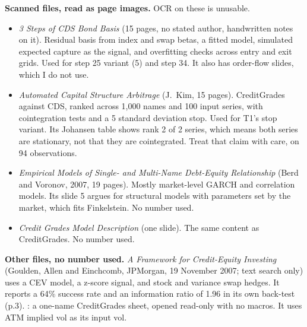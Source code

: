 \documentclass[10pt,a4paper]{article}
\begin{document}
\textbf{Scanned files, read as page images.} OCR on these is unusable.
\begin{itemize}[nosep]
\item \emph{3 Steps of CDS Bond Basis} (15 pages, no stated author, handwritten notes on it). Residual basis from index and swap betas, a fitted model, simulated expected capture as the signal, and overfitting checks across entry and exit grids. Used for step 25 variant (5) and step 34. It also has order-flow slides, which I do not use.
\item \emph{Automated Capital Structure Arbitrage} (J.\ Kim, 15 pages). CreditGrades against CDS, ranked across 1,000 names and 100 input series, with cointegration tests and a 5 standard deviation stop. Used for T1's stop variant. Its Johansen table shows rank 2 of 2 series, which means both series are stationary, not that they are cointegrated. Treat that claim with care, on 94 observations.
\item \emph{Empirical Models of Single- and Multi-Name Debt-Equity Relationship} (Berd and Voronov, 2007, 19 pages). Mostly market-level GARCH and correlation models. Its slide 5 argues for structural models with parameters set by the market, which fits Finkelstein. No number used.
\item \emph{Credit Grades Model Description} (one slide). The same content as CreditGrades. No number used.
\end{itemize}
\textbf{Other files, no number used.} \emph{A Framework for Credit-Equity Investing} (Goulden, Allen and Einchcomb, JPMorgan, 19 November 2007; text search only) uses a CEV model, a z-score signal, and stock and variance swap hedges. It reports a 64\% success rate and an information ratio of 1.96 in its own back-test (p.3). : a one-name CreditGrades sheet, opened read-only with no macros. It uses ATM implied vol as its input vol.
\end{document}

